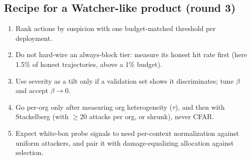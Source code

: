 \documentclass[11pt]{article}
\begin{document}
\subsection*{Recipe for a Watcher-like product (round 3)}
\begin{enumerate}
\item Rank actions by suspicion with one budget-matched threshold per deployment.
\item Do not hard-wire an always-block tier: measure its honest hit rate first (here 1.5\% of honest trajectories, above a 1\% budget).
\item Use severity as a tilt only if a validation set shows it discriminates; tune $\beta$ and accept $\beta\to0$.
\item Go per-org only after measuring org heterogeneity ($\tau$), and then with Stackelberg (with $\ge$20 attacks per org, or shrunk), never CFAR.
\item Expect white-box probe signals to need per-context normalization against uniform attackers, and pair it with damage-equalizing allocation against selection.
\end{enumerate}
\end{document}
